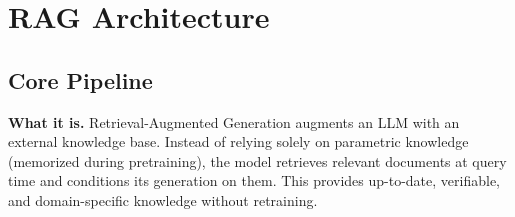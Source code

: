 \section{RAG Architecture}
\label{sec:rag_architecture}

\subsection{Core Pipeline}

\textbf{What it is.} Retrieval-Augmented Generation augments an LLM with an external knowledge base. Instead of relying solely on parametric knowledge (memorized during pretraining), the model retrieves relevant documents at query time and conditions its generation on them. This provides up-to-date, verifiable, and domain-specific knowledge without retraining.

